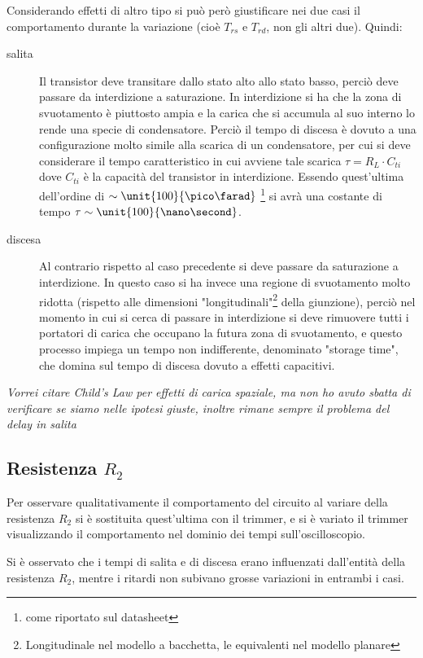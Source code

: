 \documentclass[10pt,a4paper]{article}
\begin{document}
Considerando effetti di altro tipo si può però giustificare nei due casi il comportamento durante la variazione (cioè $T_{rs}$ e $T_{rd}$, non gli altri due). Quindi:
\begin{description}
\item[salita] Il transistor deve transitare dallo stato alto allo stato basso, perciò deve passare da interdizione a saturazione. In interdizione si ha che la zona di svuotamento è piuttosto ampia e la carica che si accumula al suo interno lo rende una specie di condensatore. Perciò il tempo di discesa è dovuto a una configurazione molto simile alla scarica di un condensatore, per cui si deve considerare il tempo caratteristico in cui avviene tale scarica $\tau = R_L \cdot C_{ti}$ dove $C_{ti}$ è la capacità del transistor in interdizione. Essendo quest'ultima dell'ordine di $\sim \unit{100}{\pico\farad}$ \footnote{come riportato sul datasheet} si avrà una costante di tempo $\tau \sim \unit{100}{\nano\second}$.

\item[discesa] Al contrario rispetto al caso precedente si deve passare da saturazione a interdizione. In questo caso si ha invece una regione di svuotamento molto ridotta (rispetto alle dimensioni "longitudinali"\footnote{Longitudinale nel modello a bacchetta, le equivalenti nel modello planare} della giunzione), perciò nel momento in cui si cerca di passare in interdizione si deve rimuovere tutti i portatori di carica che occupano la futura zona di svuotamento, e questo processo impiega un tempo non indifferente, denominato "storage time", che domina sul tempo di discesa dovuto a effetti capacitivi.
\end{description}

\emph{Vorrei citare Child's Law per effetti di carica spaziale, ma non ho avuto sbatta di verificare se siamo nelle ipotesi giuste, inoltre rimane sempre il problema del delay in salita}


\subsection{Resistenza $R_2$}
Per osservare qualitativamente il comportamento del circuito al variare della resistenza $R_2$ si è sostituita quest'ultima con il trimmer, e si è variato il trimmer visualizzando il comportamento nel dominio dei tempi sull'oscilloscopio.

Si è osservato che i tempi di salita e di discesa erano influenzati dall'entità della resistenza $R_2$, mentre i ritardi non subivano grosse variazioni in entrambi i casi.
\end{document}
